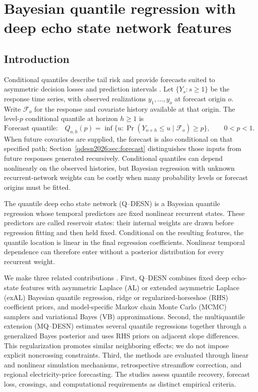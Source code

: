 \chapter{Bayesian quantile regression with deep echo state network features}
\label{ch:research-c}




\section{Introduction}
\label{qdesn2026:sec:intro}

Conditional quantiles describe tail risk and provide forecasts suited to
asymmetric decision losses and prediction intervals
\citep{qdesn-KoenkerBassett1978,qdesn-Koenker2005,qdesn-Gneiting2011}. Let
\(\{Y_s:s\geq1\}\) be the response time series, with observed realizations
\(y_1,\ldots,y_o\) at forecast origin \(o\). Write \(\mathcal F_o\) for the
response and covariate history available at that origin. The level-\(p\)
conditional quantile at horizon \(h\geq1\) is
\[
\text{Forecast quantile:}\quad
Q_{o,h}(p)=\inf\{u:\Pr(Y_{o+h}\le u\mid\mathcal F_o)\ge p\},
\qquad 0<p<1.
\]
When future covariates are supplied, the forecast is also conditional on that
specified path; Section~\ref{qdesn2026:sec:forecast} distinguishes those inputs
from future responses generated recursively. Conditional quantiles can depend
nonlinearly on the observed histories, but Bayesian regression with unknown
recurrent-network weights can be costly when many probability levels or
forecast origins must be fitted.

The quantile deep echo state network (Q--DESN) is a Bayesian quantile
regression whose temporal predictors are fixed nonlinear recurrent states.
These predictors are called reservoir states: their internal weights are
drawn before regression fitting and then held fixed. Conditional on the
resulting features, the quantile location is linear in the final regression
coefficients. Nonlinear temporal dependence can therefore enter without a
posterior distribution for every recurrent weight.

We make three related contributions \citep{qdesn-deleon2026qdesn}.
First, Q--DESN combines fixed deep echo-state features with asymmetric Laplace
(AL) or extended asymmetric Laplace (exAL) Bayesian quantile regression, ridge
or regularized-horseshoe (RHS) coefficient priors, and model-specific Markov
chain Monte Carlo (MCMC) samplers and variational Bayes (VB) approximations.
Second, the
multiquantile extension (MQ--DESN) estimates several quantile regressions
together through a generalized Bayes posterior and uses RHS priors on adjacent
slope differences. This regularization promotes similar neighboring effects;
we do not impose explicit noncrossing constraints. Third,
the methods are evaluated through linear and nonlinear simulation mechanisms,
retrospective streamflow correction, and regional electricity-price
forecasting. The studies assess quantile recovery, forecast loss, crossings,
and computational requirements as distinct empirical criteria.

